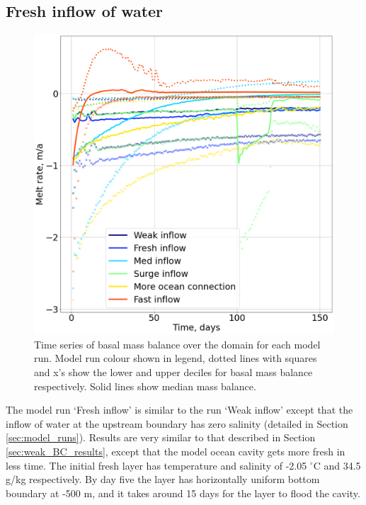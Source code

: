 \subsection{Fresh inflow of water} \label{sec:fresh_inflow}
\begin{figure}[!ht]
\centering
\includegraphics[width=1\textwidth]{chapters/4/compare_melt_sum.png}
\caption[Melt sum comparison]{Time series of basal mass balance over the domain for each model run. Model run colour shown in legend, dotted lines with squares and x's show the lower and upper deciles for basal mass balance respectively. Solid lines show median mass balance.}
\label{fig:compare_melt_sum}
\end{figure}


The model run `Fresh inflow' is similar to the run `Weak inflow' except that the inflow of water at the upstream boundary has zero salinity (detailed in Section \ref{sec:model_runs}). Results are very similar to that described in Section \ref{sec:weak_BC_results}, except that the model ocean cavity gets more fresh in less time.
The initial fresh layer has temperature and salinity of -2.05 $^{\circ}$C and 34.5  g/kg respectively.  By day five the layer has horizontally uniform bottom boundary at -500 m, and it takes around 15 days for the layer to flood the cavity.


